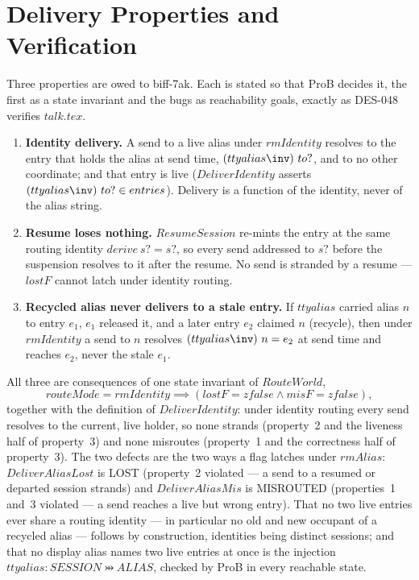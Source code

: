 \documentclass[a4paper,10pt,fleqn]{article}
\begin{document}
\section{Delivery Properties and Verification}
\label{sec:delivery}

Three properties are owed to biff-7ak.  Each is stated so that ProB
decides it, the first as a state invariant and the bugs as reachability
goals, exactly as DES-048 verifies $talk.tex$.

\begin{enumerate}
\item \textbf{Identity delivery.}  A send to a live alias under
  $rmIdentity$ resolves to the entry that holds the alias at send time,
  $(ttyalias\inv)~to?$, and to no other coordinate; and that entry is
  live ($DeliverIdentity$ asserts $(ttyalias\inv)~to? \in entries$).
  Delivery is a function of the identity, never of the alias string.

\item \textbf{Resume loses nothing.}  $ResumeSession$ re-mints the entry
  at the same routing identity $derive~s? = s?$, so every send
  addressed to $s?$ before the suspension resolves to it after the
  resume.  No send is stranded by a resume --- $lostF$ cannot latch under
  identity routing.

\item \textbf{Recycled alias never delivers to a stale entry.}  If
  $ttyalias$ carried alias $n$ to entry $e_1$, $e_1$ released it, and a
  later entry $e_2$ claimed $n$ (recycle), then under $rmIdentity$ a send
  to $n$ resolves $(ttyalias\inv)~n = e_2$ at send time and reaches $e_2$,
  never the stale $e_1$.
\end{enumerate}

All three are consequences of one state invariant of $RouteWorld$,
$$routeMode = rmIdentity \implies (lostF = zfalse \land misF = zfalse),$$
together with the definition of $DeliverIdentity$: under identity routing
every send resolves to the current, live holder, so none strands
(property~2 and the liveness half of property~3) and none misroutes
(property~1 and the correctness half of property~3).  The two defects are
the two ways a flag latches under $rmAlias$: $DeliverAliasLost$ is LOST
(property~2 violated --- a send to a resumed or departed session strands)
and $DeliverAliasMis$ is MISROUTED (properties~1 and~3 violated --- a send
reaches a live but wrong entry).  That no two live entries ever share a
routing identity --- in particular no old and new occupant of a recycled
alias --- follows by construction, identities being distinct sessions; and that no display alias
names two live entries at once is the injection
$ttyalias : SESSION \pinj ALIAS$, checked by ProB in every
reachable state.
\end{document}
